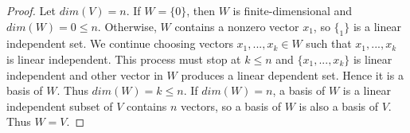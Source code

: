 \begin{proof}
	Let $dim(V)=n$. If $W=\{0\}$, then $W$ is finite-dimensional and $dim(W)=0 \leq n$. Otherwise, $W$ contains a nonzero vector $x_1$, so $\{_1\}$ is a linear independent set. We continue choosing vectors $x_1,...,x_k \in W$ such that ${x_1,...,x_k}$ is linear independent. This process must stop at $k \leq n$ and $\{x_1,...,x_k\}$ is linear independent and other vector in $W$ produces a linear dependent set. Hence it is a basis of $W$. Thus $dim(W)=k \leq n$. If $dim(W)=n$, a basis of $W$ is a linear independent subset of $V$ contains $n$ vectors, so a basis of $W$ is also a basis of $V$. Thus $W=V$.

\end{proof}